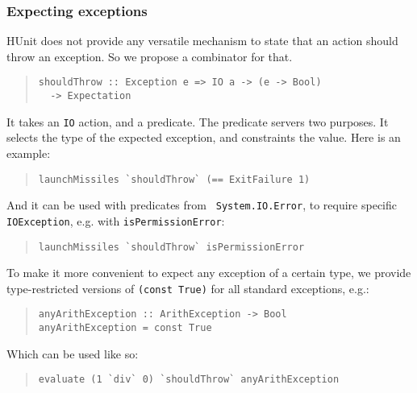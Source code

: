 \documentclass[preprint]{sigplanconf}
\begin{document}
\subsubsection{Expecting exceptions}
\label{sec:expacting-exceptions}

HUnit does not provide any versatile mechanism to state that an action
should throw an exception.  So we propose a combinator for that.

\begin{quote}
\small
\begin{verbatim}
shouldThrow :: Exception e => IO a -> (e -> Bool)
  -> Expectation
\end{verbatim}
\end{quote}

\noindent It takes an {\tt IO} action, and a predicate.  The predicate
servers two purposes.  It selects the type of the expected exception,
and constraints the value.  Here is an example:

\begin{quote}
\small
\begin{verbatim}
launchMissiles `shouldThrow` (== ExitFailure 1)
\end{verbatim}
\end{quote}

\noindent And it can be used with predicates from {\tt
System.IO.Error}, to require specific {\tt IOException}, e.g.  with
{\tt isPermissionError}:

\begin{quote}
\small
\begin{verbatim}
launchMissiles `shouldThrow` isPermissionError
\end{verbatim}
\end{quote}

\noindent To make it more convenient to expect any exception of a
certain type, we provide type-restricted versions of {\tt (const
True)} for all standard exceptions, e.g.:

\begin{quote}
\small
\begin{verbatim}
anyArithException :: ArithException -> Bool
anyArithException = const True
\end{verbatim}
\end{quote}

\noindent Which can be used like so:

\begin{quote}
\small
\begin{verbatim}
evaluate (1 `div` 0) `shouldThrow` anyArithException
\end{verbatim}
\end{quote}
\end{document}
